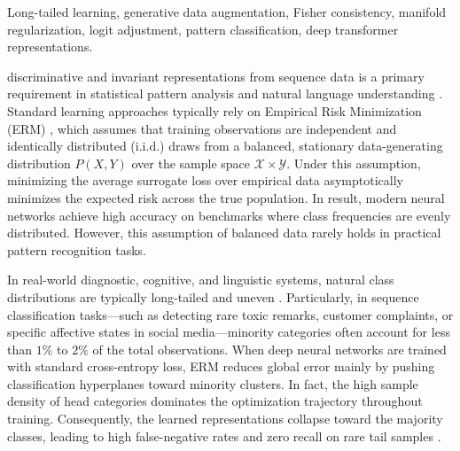 \documentclass[10pt,journal,compsoc]{IEEEtran}
\begin{document}
{\begin{IEEEkeywords}
Long-tailed learning, generative data augmentation, Fisher consistency, manifold regularization, logit adjustment, pattern classification, deep transformer representations.
\end{IEEEkeywords}}

\maketitle
\IEEEdisplaynontitleabstractindextext
\IEEEpeerreviewmaketitle


 discriminative and invariant representations from sequence data is a primary requirement in statistical pattern analysis and natural language understanding \cite{vaswani2017attention, devlin2019bert, cahyawijaya2021indonlg, koto2021discourse}. Standard learning approaches typically rely on Empirical Risk Minimization (ERM) \cite{zhang2023deep}, which assumes that training observations are independent and identically distributed ($\text{i.i.d.}$) draws from a balanced, stationary data-generating distribution $P(X, Y)$ over the sample space $\mathcal{X} \times \mathcal{Y}$. Under this assumption, minimizing the average surrogate loss over empirical data asymptotically minimizes the expected risk across the true population. In result, modern neural networks achieve high accuracy on benchmarks where class frequencies are evenly distributed. However, this assumption of balanced data rarely holds in practical pattern recognition tasks.

In real-world diagnostic, cognitive, and linguistic systems, natural class distributions are typically long-tailed and uneven \cite{raudys1991small, he2009learning, menon2021longtail, kini2021vector}. Particularly, in sequence classification tasks—such as detecting rare toxic remarks, customer complaints, or specific affective states in social media—minority categories often account for less than $1\%$ to $2\%$ of the total observations. When deep neural networks are trained with standard cross-entropy loss, ERM reduces global error mainly by pushing classification hyperplanes toward minority clusters. In fact, the high sample density of head categories dominates the optimization trajectory throughout training. Consequently, the learned representations collapse toward the majority classes, leading to high false-negative rates and zero recall on rare tail samples \cite{zhang2023deep, zhang2022balanced}.
\end{document}
